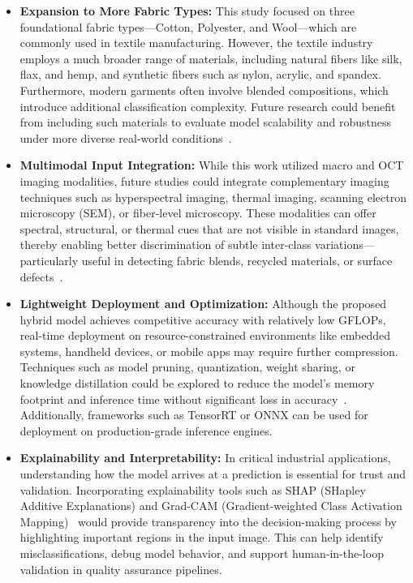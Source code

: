 \begin{itemize}
    \item \textbf{Expansion to More Fabric Types:} This study focused on three foundational fabric types—Cotton, Polyester, and Wool—which are commonly used in textile manufacturing. However, the textile industry employs a much broader range of materials, including natural fibers like silk, flax, and hemp, and synthetic fibers such as nylon, acrylic, and spandex. Furthermore, modern garments often involve blended compositions, which introduce additional classification complexity. Future research could benefit from including such materials to evaluate model scalability and robustness under more diverse real-world conditions~\cite{kampouris2016fine}.
    
    \item \textbf{Multimodal Input Integration:} While this work utilized macro and OCT imaging modalities, future studies could integrate complementary imaging techniques such as hyperspectral imaging, thermal imaging, scanning electron microscopy (SEM), or fiber-level microscopy. These modalities can offer spectral, structural, or thermal cues that are not visible in standard images, thereby enabling better discrimination of subtle inter-class variations—particularly useful in detecting fabric blends, recycled materials, or surface defects~\cite{sabuncu2022optical}.
    
    \item \textbf{Lightweight Deployment and Optimization:} Although the proposed hybrid model achieves competitive accuracy with relatively low GFLOPs, real-time deployment on resource-constrained environments like embedded systems, handheld devices, or mobile apps may require further compression. Techniques such as model pruning, quantization, weight sharing, or knowledge distillation could be explored to reduce the model’s memory footprint and inference time without significant loss in accuracy~\cite{touvron2021training}. Additionally, frameworks such as TensorRT or ONNX can be used for deployment on production-grade inference engines.

    \item \textbf{Explainability and Interpretability:} In critical industrial applications, understanding how the model arrives at a prediction is essential for trust and validation. Incorporating explainability tools such as SHAP (SHapley Additive Explanations) and Grad-CAM (Gradient-weighted Class Activation Mapping)~\cite{selvaraju2017grad} would provide transparency into the decision-making process by highlighting important regions in the input image. This can help identify misclassifications, debug model behavior, and support human-in-the-loop validation in quality assurance pipelines.


\end{itemize}
